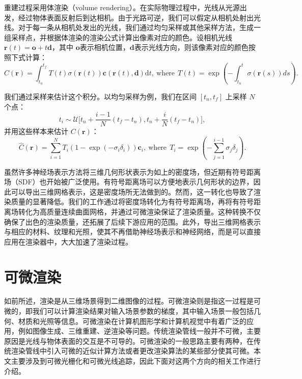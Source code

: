 重建过程采用体渲染（volume rendering）。在实际物理过程中，光线从光源出发，经过物体表面反射后到达相机。由于光路可逆，我们可以假定从相机处射出光线。对于每一条从相机处发出的光线，我们通过均匀采样或其他采样方法，生成一组采样点，并根据体渲染的渲染公式计算出像素对应的颜色。设相机光线 $\mathbf{r}(t)=\mathbf{o}+t\mathbf{d}$，其中 $\mathbf{o}$表示相机位置，$\mathbf{d}$表示光线方向，则该像素对应的颜色按照下式计算：
\begin{equation}
  C(\mathbf{r})=\int_{t_n}^{t_f}T(t)\sigma(\mathbf{r}(t))\mathbf{c}(\mathbf{r}(t),\mathbf{d}) \mathrm{d}t , \ \mathrm{where} \ \ T(t)=\exp\left(-\int_{t_n}^t\sigma(\mathbf{r}(s))ds\right).
\end{equation}

我们通过采样来估计这个积分。以均匀采样为例，我们在区间 $\left[t_n,t_f\right]$ 上采样 $N$ 个点：
\begin{equation}
  t_i\sim\mathcal{U}\bigg[t_n+\frac{i-1}{N}(t_f-t_n), t_n+\frac{i}{N}(t_f-t_n)\bigg],
\end{equation}
并用这些样本来估计 $C(\mathbf{r})$：
\begin{equation}
  \hat C(\mathbf{r})=\sum_{i=1}^NT_i(1-\exp(-\sigma_i\delta_i))\mathbf{c}_i , \ \mathrm{where} \ \ T_i=\exp\left(-\sum_{j=1}^{i-1}\sigma_j\delta_j\right).
\end{equation}

虽然许多神经场表示方法将三维几何形状表示为如上的密度场，但近期有符号距离场（SDF）也开始被广泛使用。有符号距离场可以方便地表示几何形状的边界，因此可以导出三维网格表示，这是密度场所无法做到的。然而，这一转化也导致了渲染质量的显著降低。我们的工作通过将密度场转化为有符号距离场，再将有符号距离场转化为高质量连续曲面网格，并通过可微渲染保证了渲染质量。这种转换不仅确保了出色的渲染质量，还拓展了后续下游应用的范围。此外，导出三维网格表示与相应的材料、纹理和光照，使其不再借助神经场表示和神经网络，而是可以直接应用在渲染器中，大大加速了渲染过程。

\section{可微渲染}

如前所述，渲染是从三维场景得到二维图像的过程。可微渲染则是指这一过程是可微的，即我们可以计算渲染结果对输入场景参数的梯度，其中输入场景一般包括几何、材质和光照等信息。可微渲染在计算机图形学和计算机视觉中有着广泛的应用，例如图像生成、三维重建、逆渲染等问题。传统渲染管线一般并不可微，主要原因是光线与物体表面的交互是不可导的。可微渲染的一般思路主要有两种，在传统渲染管线中引入可微的近似计算方法或者更改渲染算法的某些部分使其可微。本文主要涉及到可微光栅化和可微光线追踪，因此下面对这两个方向的相关工作进行介绍。

